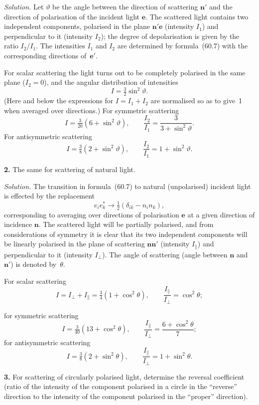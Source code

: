 \textit{Solution.} Let $\vartheta$ be the angle between the direction of scattering $\mathbf{n}'$ and the direction of polarisation of the incident light $\mathbf{e}$. The scattered light contains two independent components, polarised in the plane $\mathbf{n}'\mathbf{e}$ (intensity $I_1$) and perpendicular to it (intensity $I_2$); the degree of depolarisation is given by the ratio $I_2/I_1$. The intensities $I_1$ and $I_2$ are determined by formula~(60.7) with the corresponding directions of~$\mathbf{e}'$.

For scalar scattering the light turns out to be completely polarised in the same plane ($I_2 = 0$), and the angular distribution of intensities
\[
I = \tfrac{3}{2}\sin^2\vartheta.
\]
(Here and below the expressions for $I = I_1 + I_2$ are normalised so as to give~1 when averaged over directions.) For symmetric scattering
\[
I = \tfrac{3}{20}(6 + \sin^2\vartheta),\qquad \frac{I_2}{I_1} = \frac{3}{3 + \sin^2\vartheta}.
\]
For antisymmetric scattering
\[
I = \tfrac{3}{8}(2 + \sin^2\vartheta),\qquad \frac{I_2}{I_1} = 1 + \sin^2\vartheta.
\]

\textbf{2.} The same for scattering of natural light.

\textit{Solution.} The transition in formula~(60.7) to natural (unpolarised) incident light is effected by the replacement
\[
e_ie^*_k \to \tfrac{1}{2}(\delta_{ik} - n_in_k),
\]
corresponding to averaging over directions of polarisation $\mathbf{e}$ at a given direction of incidence $\mathbf{n}$. The scattered light will be partially polarised, and from considerations of symmetry it is clear that its two independent components will be linearly polarised in the plane of scattering $\mathbf{n}\mathbf{n}'$ (intensity $I_\parallel$) and perpendicular to it (intensity $I_\perp$). The angle of scattering (angle between $\mathbf{n}$ and $\mathbf{n}'$) is denoted by~$\theta$.

For scalar scattering
\[
I = I_\perp + I_\parallel = \tfrac{3}{4}(1 + \cos^2\theta),\qquad \frac{I_\parallel}{I_\perp} = \cos^2\theta;
\]

for symmetric scattering
\[
I = \tfrac{3}{40}(13 + \cos^2\theta),\qquad \frac{I_\parallel}{I_\perp} = \frac{6 + \cos^2\theta}{7};
\]
for antisymmetric scattering
\[
I = \tfrac{3}{8}(2 + \sin^2\theta),\qquad \frac{I_\parallel}{I_\perp} = 1 + \sin^2\theta.
\]

\textbf{3.} For scattering of circularly polarised light, determine the reversal coefficient (ratio of the intensity of the component polarised in a circle in the ``reverse'' direction to the intensity of the component polarised in the ``proper'' direction).

